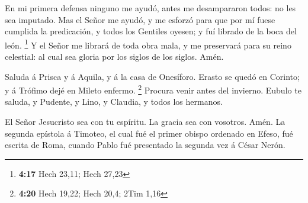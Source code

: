  En mi primera defensa ninguno me ayudó, antes me
desampararon todos: no les sea imputado.  Mas el Señor me
ayudó, y me esforzó para que por mí fuese cumplida la predicación, y
todos los Gentiles oyesen; y fuí librado de la boca del león.
\footnote{\textbf{4:17} Hech 23,11; Hech 27,23}  Y el Señor
me librará de toda obra mala, y me preservará para su reino celestial:
al cual sea gloria por los siglos de los siglos. Amén.

 Saluda á Prisca y á Aquila, y á la casa de Onesíforo.
 Erasto se quedó en Corinto; y á Trófimo dejé en Mileto
enfermo. \footnote{\textbf{4:20} Hech 19,22; Hech 20,4; 2Tim 1,16}
 Procura venir antes del invierno. Eubulo te saluda, y
Pudente, y Lino, y Claudia, y todos los hermanos.

 El Señor Jesucristo sea con tu espíritu. La gracia sea con
vosotros. Amén. La segunda epístola á Timoteo, el cual fué el primer
obispo ordenado en Efeso, fué escrita de Roma, cuando Pablo fué
presentado la segunda vez á César Nerón.
